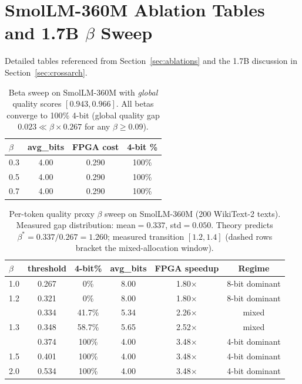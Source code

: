 \documentclass{article}
\begin{document}
\section{SmolLM-360M Ablation Tables and 1.7B $\beta$ Sweep}
\label{app:smolLM360m_ablations}

Detailed tables referenced from Section~\ref{sec:ablations} and the 1.7B discussion in Section~\ref{sec:crossarch}.

\begin{table}[h]
\centering
\caption{Beta sweep on SmolLM-360M with \emph{global} quality scores $[0.943, 0.966]$. All betas converge to 100\% 4-bit (global quality gap $0.023 \ll \beta \times 0.267$ for any $\beta \geq 0.09$).}
\begin{tabular}{lccc}
\toprule
$\beta$ & avg\_bits & FPGA cost & 4-bit \% \\
\midrule
0.3 & 4.00 & 0.290 & 100\% \\
0.5 & 4.00 & 0.290 & 100\% \\
0.7 & 4.00 & 0.290 & 100\% \\
\bottomrule
\end{tabular}
\label{tab:sweep}
\end{table}

\begin{table}[h]
\centering
\caption{Per-token quality proxy $\beta$ sweep on SmolLM-360M (200 WikiText-2 texts). Measured gap distribution: mean$=0.337$, std$=0.050$. Theory predicts $\beta^* = 0.337/0.267 = 1.260$; measured transition $[1.2, 1.4]$ (dashed rows bracket the mixed-allocation window).}
\begin{tabular}{lccccc}
\toprule
$\beta$ & threshold & 4-bit\% & avg\_bits & FPGA speedup & Regime \\
\midrule
1.0  & 0.267 & 0\%    & 8.00 & 1.80$\times$ & 8-bit dominant \\
1.2  & 0.321 & 0\%    & 8.00 & 1.80$\times$ & 8-bit dominant \\
\hdashline
1.25 & 0.334 & 41.7\% & 5.34 & 2.26$\times$ & mixed \\
1.3  & 0.348 & 58.7\% & 5.65 & 2.52$\times$ & mixed \\
\hdashline
1.4  & 0.374 & 100\%  & 4.00 & 3.48$\times$ & 4-bit dominant \\
1.5  & 0.401 & 100\%  & 4.00 & 3.48$\times$ & 4-bit dominant \\
2.0  & 0.534 & 100\%  & 4.00 & 3.48$\times$ & 4-bit dominant \\
\bottomrule
\end{tabular}
\label{tab:pertok_sweep}
\end{table}
\end{document}
